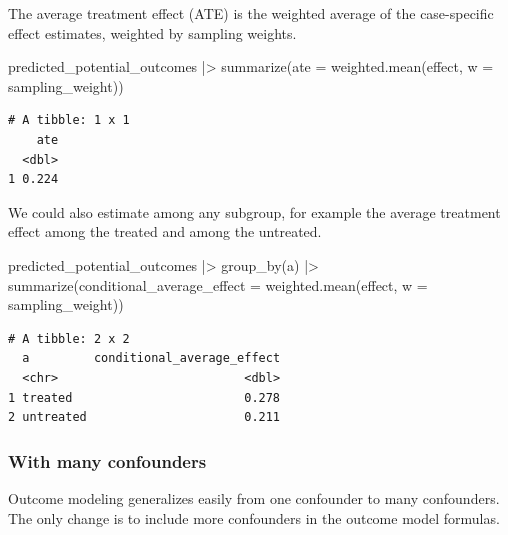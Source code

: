 \documentclass[
  letterpaper,
  DIV=11,
  numbers=noendperiod]{scrartcl}
\newenvironment{Shaded}{\begin{snugshade}}{\end{snugshade}}
\newcommand{\AttributeTok}[1]{\textcolor[rgb]{0.40,0.45,0.13}{#1}}
\newcommand{\FunctionTok}[1]{\textcolor[rgb]{0.28,0.35,0.67}{#1}}
\newcommand{\NormalTok}[1]{\textcolor[rgb]{0.00,0.23,0.31}{#1}}
\newcommand{\SpecialCharTok}[1]{\textcolor[rgb]{0.37,0.37,0.37}{#1}}
\begin{document}
The average treatment effect (ATE) is the weighted average of the
case-specific effect estimates, weighted by sampling weights.

\begin{Shaded}
\begin{Highlighting}[]
\NormalTok{predicted\_potential\_outcomes }\SpecialCharTok{|\textgreater{}}
  \FunctionTok{summarize}\NormalTok{(}\AttributeTok{ate =} \FunctionTok{weighted.mean}\NormalTok{(effect, }\AttributeTok{w =}\NormalTok{ sampling\_weight))}
\end{Highlighting}
\end{Shaded}

\begin{verbatim}
# A tibble: 1 x 1
    ate
  <dbl>
1 0.224
\end{verbatim}

We could also estimate among any subgroup, for example the average
treatment effect among the treated and among the untreated.

\begin{Shaded}
\begin{Highlighting}[]
\NormalTok{predicted\_potential\_outcomes }\SpecialCharTok{|\textgreater{}}
  \FunctionTok{group\_by}\NormalTok{(a) }\SpecialCharTok{|\textgreater{}}
  \FunctionTok{summarize}\NormalTok{(}\AttributeTok{conditional\_average\_effect =} \FunctionTok{weighted.mean}\NormalTok{(effect, }\AttributeTok{w =}\NormalTok{ sampling\_weight))}
\end{Highlighting}
\end{Shaded}

\begin{verbatim}
# A tibble: 2 x 2
  a         conditional_average_effect
  <chr>                          <dbl>
1 treated                        0.278
2 untreated                      0.211
\end{verbatim}

\subsubsection{With many confounders}\label{with-many-confounders}

Outcome modeling generalizes easily from one confounder to many
confounders. The only change is to include more confounders in the
outcome model formulas.
\end{document}
